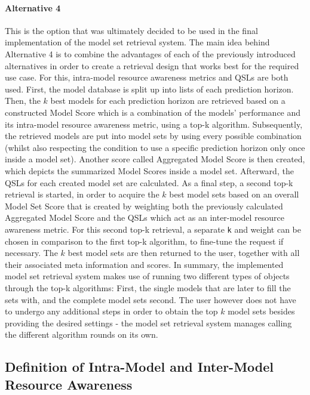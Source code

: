 \paragraph{Alternative 4}
This is the option that was ultimately decided to be used in the final implementation of the model set retrieval system. The main idea behind Alternative 4 is to combine the advantages of each of the previously introduced alternatives in order to create a retrieval design that works best for the required use case. For this, intra-model resource awareness metrics and QSLs are both used. First, the model database is split up into lists of each prediction horizon. Then, the $k$ best models for each prediction horizon are retrieved based on a constructed Model Score which is a combination of the models' performance and its intra-model resource awareness metric, using a top-k algorithm. Subsequently, the retrieved models are put into model sets by using every possible combination (whilst also respecting the condition to use a specific prediction horizon only once inside a model set). Another score called Aggregated Model Score is then created, which depicts the summarized Model Scores inside a model set. Afterward, the QSLs for each created model set are calculated. As a final step, a second top-k retrieval is started, in order to acquire the $k$ best model sets based on an overall Model Set Score that is created by weighting both the previously calculated Aggregated Model Score and the QSLs which act as an inter-model resource awareness metric. For this second top-k retrieval, a separate \texttt{k} and weight can be chosen in comparison to the first top-k algorithm, to fine-tune the request if necessary. The $k$ best model sets are then returned to the user, together with all their associated meta information and scores. In summary, the implemented model set retrieval system makes use of running two different types of objects through the top-k algorithms: First, the single models that are later to fill the sets with, and the complete model sets second. The user however does not have to undergo any additional steps in order to obtain the top $k$ model sets besides providing the desired settings - the model set retrieval system manages calling the different algorithm rounds on its own.


\subsection{Definition of Intra-Model and Inter-Model Resource Awareness}\label{sec:defRA}

